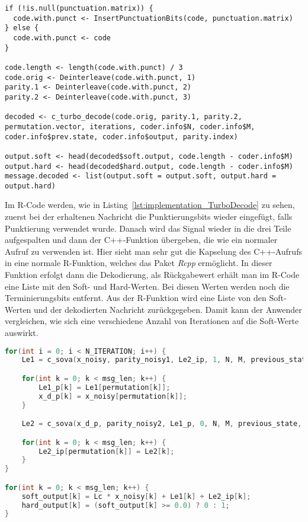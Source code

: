 \begin{lstlisting}[caption=Implementierung von \texttt{TurboDecode}, label={lst:implementation_TurboDecode}, float=!th]
if (!is.null(punctuation.matrix)) {
  code.with.punct <- InsertPunctuationBits(code, punctuation.matrix)
} else {
  code.with.punct <- code
}

code.length <- length(code.with.punct) / 3
code.orig <- Deinterleave(code.with.punct, 1)
parity.1 <- Deinterleave(code.with.punct, 2)
parity.2 <- Deinterleave(code.with.punct, 3)

decoded <- c_turbo_decode(code.orig, parity.1, parity.2, permutation.vector, iterations, coder.info$N, coder.info$M, coder.info$prev.state, coder.info$output, parity.index)

output.soft <- head(decoded$soft.output, code.length - coder.info$M)
output.hard <- head(decoded$hard.output, code.length - coder.info$M)
message.decoded <- list(output.soft = output.soft, output.hard = output.hard)
\end{lstlisting}


Im R-Code werden, wie in Listing~\ref{lst:implementation_TurboDecode} zu sehen, zuerst bei der erhaltenen Nachricht die Punktierungsbits wieder eingefügt, falls Punktierung verwendet wurde. Danach wird das Signal wieder in die drei Teile aufgespalten und dann der C++-Funktion übergeben, die wie ein normaler Aufruf zu verwenden ist. Hier sieht man sehr gut die Kapselung des C++-Aufrufs in eine normale R-Funktion, welches das Paket \emph{Rcpp} ermöglicht. In dieser Funktion erfolgt dann die Dekodierung, als Rückgabewert erhält man im R-Code eine Liste mit den Soft- und Hard-Werten. Bei diesen Werten werden noch die Terminierungsbits entfernt. Aus der R-Funktion wird eine Liste von den Soft-Werten und der dekodierten Nachricht
zurückgegeben. Damit kann der Anwender vergleichen, wie sich eine verschiedene Anzahl von Iterationen auf die Soft-Werte auswirkt.

\begin{lstlisting}[language=C++,caption=Implementierung der C++-Funktion zur Dekodierung, label={lst:implementation_cFunction}, float=!th]
for(int i = 0; i < N_ITERATION; i++) {
	Le1 = c_sova(x_noisy, parity_noisy1, Le2_ip, 1, N, M, previous_state, output, output_index);

    for(int k = 0; k < msg_len; k++) {
		Le1_p[k] = Le1[permutation[k]];
		x_d_p[k] = x_noisy[permutation[k]];
    }

	Le2 = c_sova(x_d_p, parity_noisy2, Le1_p, 0, N, M, previous_state, output, output_index);

    for(int k = 0; k < msg_len; k++) {
    	Le2_ip[permutation[k]] = Le2[k];
	}
}

for(int k = 0; k < msg_len; k++) {
   	soft_output[k] = Lc * x_noisy[k] + Le1[k] + Le2_ip[k];
   	hard_output[k] = (soft_output[k] >= 0.0) ? 0 : 1;
}
\end{lstlisting}

